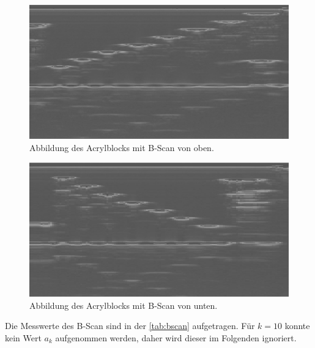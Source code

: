 \begin{figure}[H]
    \centering
	\includegraphics[width=0.8\linewidth]{data/US1_daten/b_scan_oben.jpg}
    \captionsetup{width=0.765\linewidth}
	\caption{Abbildung des Acrylblocks mit B-Scan von oben.}
	\label{fig:oben}
\end{figure}
\begin{figure}[H]
    \centering
	\includegraphics[width=0.8\linewidth]{data/US1_daten/b_scan_u.jpg}
    \captionsetup{width=0.765\linewidth}
	\caption{Abbildung des Acrylblocks mit B-Scan von unten.}
	\label{fig:unten}
\end{figure}

Die Messwerte des B-Scan sind in der \autoref{tab:bscan} aufgetragen. Für $k =10$ konnte kein Wert
$a_k$
aufgenommen werden, daher wird dieser im Folgenden ignoriert.
\begin{table}[H]
    \centering
    \caption{Messwerte des B-Scan.}
	
    \label{tab:bscan}
\end{table}

